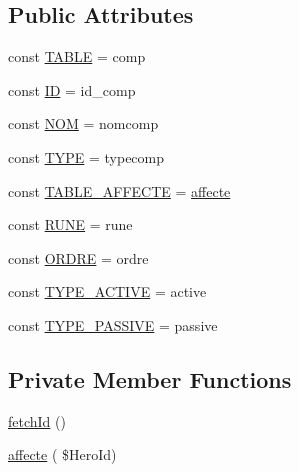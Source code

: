 \subsection*{Public Attributes}
\begin{DoxyCompactItemize}
\item 
const \hyperlink{class_hns_comp_a7257da3d475aeacccfbf2205336e58f1}{T\+A\+B\+LE} = \textquotesingle{}comp\textquotesingle{}
\item 
const \hyperlink{class_hns_comp_a3046f98cfbc36df486a9a1d7224cdeec}{ID} = \textquotesingle{}id\+\_\+comp\textquotesingle{}
\item 
const \hyperlink{class_hns_comp_a835187c62916186f042d0656b1fd148d}{N\+OM} = \textquotesingle{}nomcomp\textquotesingle{}
\item 
const \hyperlink{class_hns_comp_a33f98d7efe34a5600cb32126dd695785}{T\+Y\+PE} = \textquotesingle{}typecomp\textquotesingle{}
\item 
const \hyperlink{class_hns_comp_a969f657a681a5b17fda2716a9cca7899}{T\+A\+B\+L\+E\+\_\+\+A\+F\+F\+E\+C\+TE} = \textquotesingle{}\hyperlink{class_hns_comp_adc2876b97085870a3e10bdc3fa9931a5}{affecte}\textquotesingle{}
\item 
const \hyperlink{class_hns_comp_adab1aea651031ad061dcf1574aedf99b}{R\+U\+NE} = \textquotesingle{}rune\textquotesingle{}
\item 
const \hyperlink{class_hns_comp_af291383b1adbcdc3cc8cf15a863e0818}{O\+R\+D\+RE} = \textquotesingle{}ordre\textquotesingle{}
\item 
const \hyperlink{class_hns_comp_abc4269859fdd958b957c27312cea417c}{T\+Y\+P\+E\+\_\+\+A\+C\+T\+I\+VE} = \textquotesingle{}active\textquotesingle{}
\item 
const \hyperlink{class_hns_comp_adaa5ce719a7ccdb21775b6cd56914a9c}{T\+Y\+P\+E\+\_\+\+P\+A\+S\+S\+I\+VE} = \textquotesingle{}passive\textquotesingle{}
\end{DoxyCompactItemize}
\subsection*{Private Member Functions}
\begin{DoxyCompactItemize}
\item 
\hyperlink{class_hns_comp_aa81a8b1cb6f2ca42b2d39beeb3d36f0d}{fetch\+Id} ()
\item 
\hyperlink{class_hns_comp_adc2876b97085870a3e10bdc3fa9931a5}{affecte} ( \$Hero\+Id)
\end{DoxyCompactItemize}
